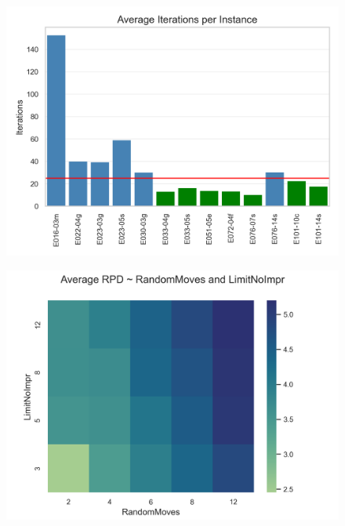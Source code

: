 \begin{figure}[ht]
  \centering
  \begin{minipage}[t]{0.49\textwidth}
    \centering
    \includegraphics[width=\linewidth]{pictures/iterations_per_instance.png}
    \label{fig:average_iterations_noclassifier}
  \end{minipage}\hfill
  \begin{minipage}[t]{0.49\textwidth}
    \centering
    \includegraphics[width=\linewidth]{pictures/heatmap_randomMoves_limitNoImpr.png}
    \label{fig:heatmap_parameter_study}
  \end{minipage}
\end{figure}

